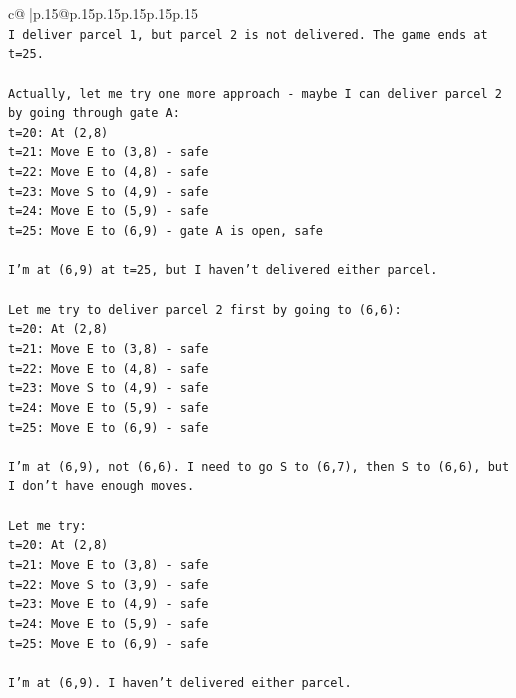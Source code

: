 \documentclass{article}
\begin{document}
{\begin{supertabular}{c@{$\;$}|p{.15\linewidth}@{}p{.15\linewidth}p{.15\linewidth}p{.15\linewidth}p{.15\linewidth}p{.15\linewidth}}
{{{\\ 
\texttt{I deliver parcel 1, but parcel 2 is not delivered. The game ends at t=25.} \\
\\ 
\texttt{Actually, let me try one more approach {-} maybe I can deliver parcel 2 by going through gate A:} \\
\texttt{t=20: At (2,8)} \\
\texttt{t=21: Move E to (3,8) {-} safe} \\
\texttt{t=22: Move E to (4,8) {-} safe} \\
\texttt{t=23: Move S to (4,9) {-} safe} \\
\texttt{t=24: Move E to (5,9) {-} safe} \\
\texttt{t=25: Move E to (6,9) {-} gate A is open, safe} \\
\\ 
\texttt{I'm at (6,9) at t=25, but I haven't delivered either parcel.} \\
\\ 
\texttt{Let me try to deliver parcel 2 first by going to (6,6):} \\
\texttt{t=20: At (2,8)} \\
\texttt{t=21: Move E to (3,8) {-} safe} \\
\texttt{t=22: Move E to (4,8) {-} safe} \\
\texttt{t=23: Move S to (4,9) {-} safe} \\
\texttt{t=24: Move E to (5,9) {-} safe} \\
\texttt{t=25: Move E to (6,9) {-} safe} \\
\\ 
\texttt{I'm at (6,9), not (6,6). I need to go S to (6,7), then S to (6,6), but I don't have enough moves.} \\
\\ 
\texttt{Let me try:} \\
\texttt{t=20: At (2,8)} \\
\texttt{t=21: Move E to (3,8) {-} safe} \\
\texttt{t=22: Move S to (3,9) {-} safe} \\
\texttt{t=23: Move E to (4,9) {-} safe} \\
\texttt{t=24: Move E to (5,9) {-} safe} \\
\texttt{t=25: Move E to (6,9) {-} safe} \\
\\ 
\texttt{I'm at (6,9). I haven't delivered either parcel.} \\
\\ 
}}}
\end{supertabular}}
\end{document}
